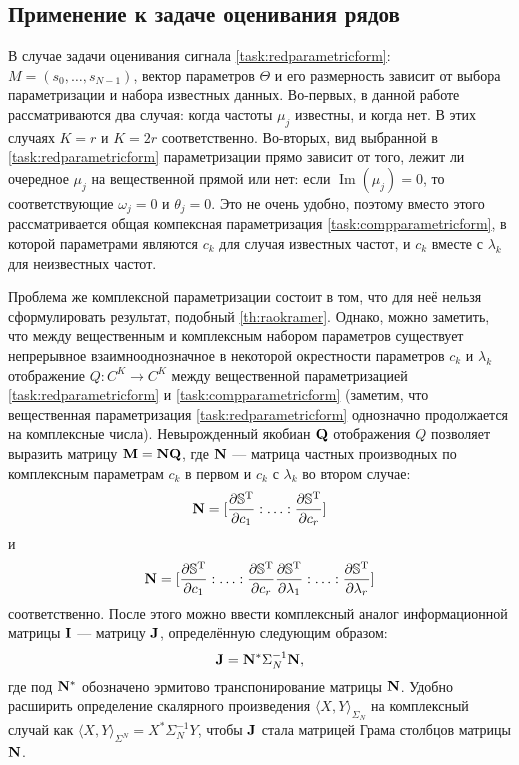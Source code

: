 \documentclass[12pt,a4paper]{article}
\begin{document}
\subsection{Применение к задаче оценивания рядов}
В случае задачи оценивания сигнала \eqref{task:redparametricform}: $M = (s_0, \ldots, s_{N-1})$, вектор параметров $\Theta$ и его размерность зависит от выбора параметризации и набора известных данных. Во-первых, в данной работе рассматриваются два случая: когда частоты $\mu_j$ известны, и когда нет. В этих случаях $K = r$ и $K = 2r$ соответственно. Во-вторых, вид выбранной в \eqref{task:redparametricform} параметризации прямо зависит от того, лежит ли очередное $\mu_j$ на вещественной прямой или нет: если $\operatorname{Im}(\mu_j) = 0$, то соответствующие $\omega_j = 0$ и $\theta_j = 0$. Это не очень удобно, поэтому вместо этого рассматривается общая компексная параметризация \eqref{task:compparametricform}, в которой параметрами являются $c_k$ для случая известных частот, и $c_k$ вместе с $\lambda_k$ для неизвестных частот. 

Проблема же комплексной параметризации состоит в том, что для неё нельзя сформулировать результат, подобный \ref{th:raokramer}. Однако, можно заметить, что между вещественным и комплексным набором параметров существует непрерывное взаимнооднозначное в некоторой окрестности параметров $c_k$ и $\lambda_k$ отображение $Q:C^K \to C^K$ между вещественной параметризацией \eqref{task:redparametricform} и \eqref{task:compparametricform} (заметим, что вещественная параметризация \eqref{task:redparametricform} однозначно продолжается на комплексные числа). Невырожденный якобиан $\mathbf{Q}$ отображения $Q$ позволяет выразить матрицу $\mathbf{M} = \mathbf{N} \mathbf{Q}$, где $\mathbf{N}$ --- матрица частных производных по комплексным параметрам $c_k$ в первом и $c_k$ с $\lambda_k$ во втором случае: 
\begin{equation}\label{eq:Nwolambdas}
\mathbf{N} = [\frac{\partial \mathbb{S}^{\mathrm{T}}}{\partial c_1}:\ldots:\frac{\partial \mathbb{S}^{\mathrm{T}}}{\partial c_r}]
\end{equation}
и 
\begin{equation}\label{eq:N}
\mathbf{N} = [\frac{\partial \mathbb{S}^{\mathrm{T}}}{\partial c_1}:\ldots:\frac{\partial \mathbb{S}^{\mathrm{T}}}{\partial c_r}\frac{\partial \mathbb{S}^{\mathrm{T}}}{\partial \lambda_1}:\ldots:\frac{\partial \mathbb{S}^{\mathrm{T}}}{\partial \lambda_r}]
\end{equation}
соответственно. После этого можно ввести комплексный аналог информационной матрицы $\mathbf{I}$ --- матрицу $\mathbf{J}$, определённую следующим образом:
\begin{equation}\label{eq:J}
\mathbf{J} = \mathbf{N}^* \Sigma_N^{-1} \mathbf{N},
\end{equation}
где под $\mathbf{N}^*$ обозначено эрмитово транспонирование матрицы $\mathbf{N}$. Удобно расширить определение скалярного произведения $\langle X, Y \rangle_{\Sigma_N}$ на комплексный случай как $\langle X, Y \rangle_{\Sigma^N} = X^* \Sigma_N^{-1} Y$, чтобы $\mathbf{J}$ стала матрицей Грама столбцов матрицы $\mathbf{N}$.
\end{document}
